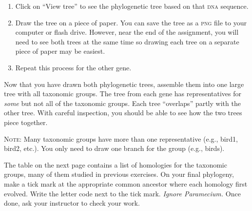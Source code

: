 \documentclass[12pt, hidelinks]{exam}
\newcommand{\dna}{\textsc{dna}}
\begin{document}
\begin{enumerate}
	\item Click on ``View tree'' to see the phylogenetic tree based on that \dna{} sequence.
	
	\item Draw the tree on a piece of paper. You can save the tree as a \textsc{png} file to your computer or flash drive. However, near the end of the assignment, you will need to see both trees at the same time so drawing each tree on a separate piece of paper may be easiest. \label{final_step}
	
	\item Repeat this process for the other gene.

\end{enumerate}

\begin{questions}

\question
Now that you have drawn both phylogenetic trees, assemble them into one large tree with all taxonomic groups. The tree from each gene has representatives for \emph{some} but not all of the taxonomic groups. Each tree ``overlaps'' partly with the other tree. With careful inspection, you should be able to see how the two trees piece together. 

\textsc{Note:} Many taxonomic groups have more than one representative (e.g., bird1, bird2, etc.). You only need to draw one branch for the group (e.g., birds).

\question[Checkout]
The table on the next page contains a list of homologies for the taxonomic groups, many of them studied in previous exercises. On your final phylogeny, make a tick mark at the appropriate common ancestor where each homology first evolved. Write the letter code next to the tick mark. \textit{Ignore Paramecium.} Once done, ask your instructor to check your work.

\end{questions}

\newpage

\thispagestyle{empty}
\end{document}
